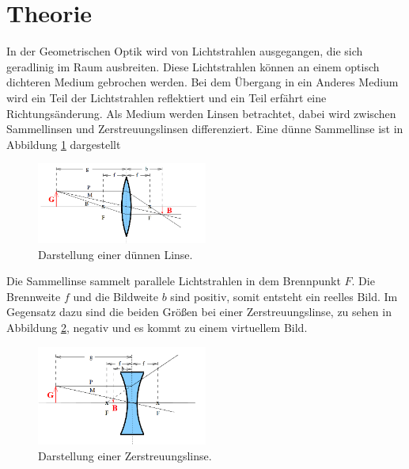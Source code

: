\section{Theorie}
\label{sec:Theorie}
In der Geometrischen Optik wird von Lichtstrahlen ausgegangen, die sich geradlinig im Raum ausbreiten.
Diese Lichtstrahlen können an einem optisch dichteren Medium gebrochen werden.
Bei dem Übergang in ein Anderes Medium wird ein Teil der Lichtstrahlen reflektiert und ein Teil erfährt eine
Richtungsänderung.
Als Medium werden Linsen betrachtet, dabei wird zwischen Sammellinsen und Zerstreuungslinsen
differenziert.
Eine dünne Sammellinse ist in Abbildung \ref{fig:duenn} dargestellt
\begin{figure}
 \centering
 \includegraphics[width=0.5\textwidth]{duenn.png}
 \caption{Darstellung einer dünnen Linse.\cite{sample}}
 \label{fig:duenn}
 \end{figure}
Die Sammellinse sammelt parallele Lichtstrahlen in dem Brennpunkt $F$. Die Brennweite $f$ und die Bildweite $b$
sind positiv, somit entsteht ein reelles Bild. Im Gegensatz dazu sind die beiden Größen bei einer Zerstreuungslinse,
zu sehen in Abbildung \ref{fig:streu}, negativ und es kommt zu einem virtuellem Bild.
\begin{figure}
 \centering
 \includegraphics[width=0.5\textwidth]{streu.png}
 \caption{Darstellung einer Zerstreuungslinse.\cite{sample}}
 \label{fig:streu}
 \end{figure}

